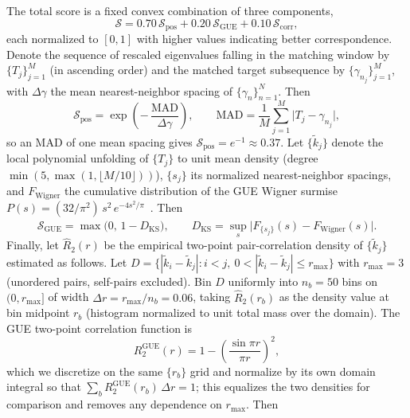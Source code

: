 \documentclass[cntp]{ipart}
\theoremstyle{plain}
\theoremstyle{remark}
\begin{document}
The total score is a fixed convex combination of three components,
\begin{equation}
    \mathcal{S} = 0.70\,\mathcal{S}_{\mathrm{pos}} + 0.20\,\mathcal{S}_{\mathrm{GUE}} + 0.10\,\mathcal{S}_{\mathrm{corr}},
\end{equation}
each normalized to $[0,1]$ with higher values indicating better correspondence. Denote the sequence of rescaled eigenvalues falling in the matching window by $\{T_j\}_{j=1}^{M}$ (in ascending order) and the matched target subsequence by $\{\gamma_{n_j}\}_{j=1}^{M}$, with $\Delta \gamma$ the mean nearest-neighbor spacing of $\{\gamma_n\}_{n=1}^{N}$. Then
\begin{equation}
    \mathcal{S}_{\mathrm{pos}} = \exp\!\left(-\,\frac{\mathrm{MAD}}{\Delta\gamma}\right), \qquad \mathrm{MAD} = \frac{1}{M}\sum_{j=1}^{M} \bigl|T_j - \gamma_{n_j}\bigr|,
\end{equation}
so an MAD of one mean spacing gives $\mathcal{S}_{\mathrm{pos}} = e^{-1} \approx 0.37$. Let $\{\tilde{k}_j\}$ denote the local polynomial unfolding of $\{T_j\}$ to unit mean density (degree $\min(5, \max(1, \lfloor M/10 \rfloor))$), $\{s_j\}$ its normalized nearest-neighbor spacings, and $F_{\mathrm{Wigner}}$ the cumulative distribution of the GUE Wigner surmise $P(s) = (32/\pi^2)\,s^2\,e^{-4s^2/\pi}$~\cite{r2}. Then
\begin{equation}
    \mathcal{S}_{\mathrm{GUE}} = \max\!\bigl(0,\,1 - D_{\mathrm{KS}}\bigr), \qquad D_{\mathrm{KS}} = \sup_s \bigl|\hat{F}_{\{s_j\}}(s) - F_{\mathrm{Wigner}}(s)\bigr|.
\end{equation}
Finally, let $\hat{R}_2(r)$ be the empirical two-point pair-correlation density of $\{\tilde{k}_j\}$ estimated as follows. Let $D = \{|\tilde{k}_i - \tilde{k}_j| : i < j,\ 0 < |\tilde{k}_i - \tilde{k}_j| \leq r_{\max}\}$ with $r_{\max} = 3$ (unordered pairs, self-pairs excluded). Bin $D$ uniformly into $n_b = 50$ bins on $(0, r_{\max}]$ of width $\Delta r = r_{\max}/n_b = 0.06$, taking $\hat{R}_2(r_b)$ as the density value at bin midpoint $r_b$ (histogram normalized to unit total mass over the domain). The GUE two-point correlation function is
\begin{equation}
    R_2^{\mathrm{GUE}}(r) = 1 - \left(\frac{\sin\pi r}{\pi r}\right)^2,
\end{equation}
which we discretize on the same $\{r_b\}$ grid and normalize by its own domain integral so that $\sum_b R_2^{\mathrm{GUE}}(r_b)\, \Delta r = 1$; this equalizes the two densities for comparison and removes any dependence on $r_{\max}$. Then
\end{document}
